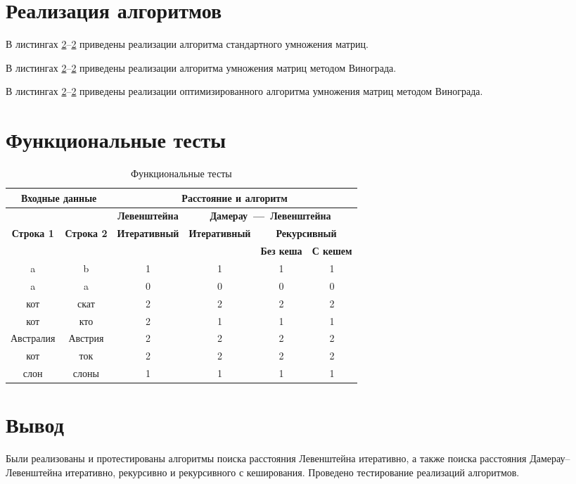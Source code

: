 \section{Реализация алгоритмов}

В листингах \ref{}--\ref{} приведены реализации алгоритма стандартного умножения матриц.

В листингах \ref{}--\ref{} приведены реализации алгоритма умножения матриц методом Винограда.

В листингах \ref{}--\ref{} приведены реализации оптимизированного алгоритма умножения матриц методом Винограда.

\section{Функциональные тесты}

\begin{table}[ht]
	\small
	\begin{center}
		\begin{threeparttable}
		\caption{Функциональные тесты}
		\label{tbl:func_tests}
		\begin{tabular}{|c|c|c|c|c|c|}
			\hline
			\multicolumn{2}{|c|}{\bfseries Входные данные}
			& \multicolumn{4}{c|}{\bfseries Расстояние и алгоритм} \\ 
			\hline 
			&
			& \multicolumn{1}{c|}{\bfseries Левенштейна} 
			& \multicolumn{3}{c|}{\bfseries Дамерау~---~Левенштейна} \\ \cline{3-6}
			
			\bfseries Строка 1 & \bfseries Строка 2 & \bfseries Итеративный & \bfseries Итеративный
			
			& \multicolumn{2}{c|}{\bfseries Рекурсивный} \\ \cline{5-6}
			& & & & \bfseries Без кеша & \bfseries С кешем \\
			\hline
			a & b & 1 & 1 & 1 & 1 \\
			\hline
			a & a & 0 & 0 & 0 & 0 \\
			\hline
			кот & скат & 2 & 2 & 2 & 2 \\
			\hline
			кот & кто & 2 & 1 & 1 & 1 \\
			\hline
			Австралия & Австрия & 2 & 2 & 2 & 2 \\
			\hline
			кот & ток & 2 & 2 & 2 & 2 \\
			\hline
			слон & слоны & 1 & 1 & 1 & 1 \\
			\hline
		\end{tabular}	
		\end{threeparttable}
	\end{center}
\end{table}

\section*{Вывод}
Были реализованы и протестированы алгоритмы поиска расстояния Левенштейна итеративно, а также поиска расстояния Дамерау–Левенштейна итеративно, рекурсивно и рекурсивного с кеширования. Проведено тестирование реализаций алгоритмов.

